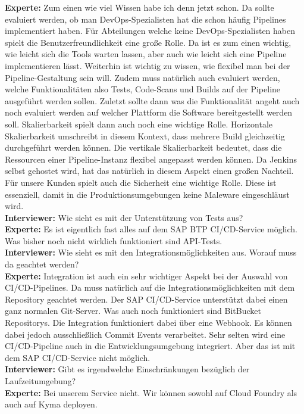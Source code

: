 \begin{linenumbers}
\textbf{Experte:} Zum einen wie viel Wissen habe ich denn jetzt schon. Da sollte evaluiert werden, ob man DevOps-Spezialisten hat die schon häufig Pipelines implementiert haben. Für Abteilungen welche keine DevOps-Spezialisten haben spielt die Benutzerfreundlichkeit eine große Rolle. Da ist es zum einen wichtig, wie leicht sich die Tools warten lassen, aber auch wie leicht sich eine Pipeline implementieren lässt. Weiterhin ist wichtig zu wissen, wie flexibel man bei der Pipeline-Gestaltung sein will. Zudem muss natürlich auch evaluiert werden, welche Funktionalitäten also Tests, Code-Scans und Builds auf der Pipeline ausgeführt werden sollen. Zuletzt sollte dann was die Funktionalität angeht auch noch evaluiert werden auf welcher Plattform die Software bereitgestellt werden soll. Skalierbarkeit spielt dann auch noch eine wichtige Rolle. Horizontale Skalierbarkeit umschreibt in diesem Kontext, dass mehrere Build gleichzeitig durchgeführt werden können. Die vertikale Skalierbarkeit bedeutet, dass die Ressourcen einer Pipeline-Instanz flexibel angepasst werden können. Da Jenkins selbst gehostet wird, hat das natürlich in diesem Aspekt einen großen Nachteil. Für unsere Kunden spielt auch die Sicherheit eine wichtige Rolle. Diese ist essenziell, damit in die Produktionsumgebungen keine Maleware eingeschläust wird.\\ 
\textbf{Interviewer:} Wie sieht es mit der Unterstützung von Tests aus?\\
\textbf{Experte:} Es ist eigentlich fast alles auf dem SAP BTP CI/CD-Service möglich. Was bisher noch nicht wirklich funktioniert sind API-Tests.\\
\textbf{Interviewer:} Wie sieht es mit den Integrationsmöglichkeiten aus. Worauf muss da geachtet werden?\\
\textbf{Experte:} Integration ist auch ein sehr wichtiger Aspekt bei der Auswahl von CI/CD-Pipelines. Da muss natürlich auf die Integrationsmöglichkeiten mit dem Repository geachtet werden. Der SAP CI/CD-Service unterstützt dabei einen ganz normalen Git-Server. Was auch noch funktioniert sind BitBucket Repositorys. Die Integration funktioniert dabei über eine Webhook. Es können dabei jedoch ausschließlich Commit Events verarbeitet. Sehr selten wird eine CI/CD-Pipeline auch in die Entwicklungsumgebung integriert. Aber das ist mit dem SAP CI/CD-Service nicht möglich.\\
\textbf{Interviewer:} Gibt es irgendwelche Einschränkungen bezüglich der Laufzeitumgebung?\\
\textbf{Experte:} Bei unserem Service nicht. Wir können sowohl auf Cloud Foundry als auch auf Kyma deployen.\\

\end{linenumbers}
